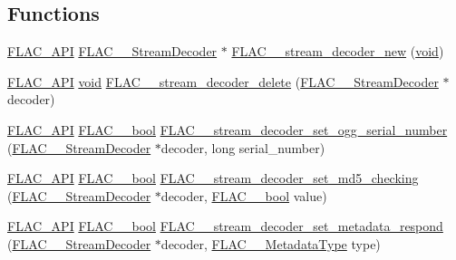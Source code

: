 \subsection*{Functions}
\begin{DoxyCompactItemize}
\item 
\hyperlink{group__flac__export_ga56ca07df8a23310707732b1c0007d6f5}{F\+L\+A\+C\+\_\+\+A\+PI} \hyperlink{struct_f_l_a_c_____stream_decoder}{F\+L\+A\+C\+\_\+\+\_\+\+Stream\+Decoder} $\ast$ \hyperlink{group__flac__stream__decoder_ga7159eefc074dfbab4a37462f69326091}{F\+L\+A\+C\+\_\+\+\_\+stream\+\_\+decoder\+\_\+new} (\hyperlink{png_8h_ac9c84fa68bbad002983e35ce3663c686}{void})
\item 
\hyperlink{group__flac__export_ga56ca07df8a23310707732b1c0007d6f5}{F\+L\+A\+C\+\_\+\+A\+PI} \hyperlink{png_8h_ac9c84fa68bbad002983e35ce3663c686}{void} \hyperlink{group__flac__stream__decoder_gab958ee28b829be37e541946676ad9677}{F\+L\+A\+C\+\_\+\+\_\+stream\+\_\+decoder\+\_\+delete} (\hyperlink{struct_f_l_a_c_____stream_decoder}{F\+L\+A\+C\+\_\+\+\_\+\+Stream\+Decoder} $\ast$decoder)
\item 
\hyperlink{group__flac__export_ga56ca07df8a23310707732b1c0007d6f5}{F\+L\+A\+C\+\_\+\+A\+PI} \hyperlink{ordinals_8h_a95103469f1cbd78b8cf250194985b34e}{F\+L\+A\+C\+\_\+\+\_\+bool} \hyperlink{group__flac__stream__decoder_ga7bb4d567a4a07c911a895b9cef7551d9}{F\+L\+A\+C\+\_\+\+\_\+stream\+\_\+decoder\+\_\+set\+\_\+ogg\+\_\+serial\+\_\+number} (\hyperlink{struct_f_l_a_c_____stream_decoder}{F\+L\+A\+C\+\_\+\+\_\+\+Stream\+Decoder} $\ast$decoder, long serial\+\_\+number)
\item 
\hyperlink{group__flac__export_ga56ca07df8a23310707732b1c0007d6f5}{F\+L\+A\+C\+\_\+\+A\+PI} \hyperlink{ordinals_8h_a95103469f1cbd78b8cf250194985b34e}{F\+L\+A\+C\+\_\+\+\_\+bool} \hyperlink{group__flac__stream__decoder_ga48074d18a17ea88e8272cc8f865ae6e6}{F\+L\+A\+C\+\_\+\+\_\+stream\+\_\+decoder\+\_\+set\+\_\+md5\+\_\+checking} (\hyperlink{struct_f_l_a_c_____stream_decoder}{F\+L\+A\+C\+\_\+\+\_\+\+Stream\+Decoder} $\ast$decoder, \hyperlink{ordinals_8h_a95103469f1cbd78b8cf250194985b34e}{F\+L\+A\+C\+\_\+\+\_\+bool} value)
\item 
\hyperlink{group__flac__export_ga56ca07df8a23310707732b1c0007d6f5}{F\+L\+A\+C\+\_\+\+A\+PI} \hyperlink{ordinals_8h_a95103469f1cbd78b8cf250194985b34e}{F\+L\+A\+C\+\_\+\+\_\+bool} \hyperlink{group__flac__stream__decoder_ga1644555cae7c54215c39bb4971100728}{F\+L\+A\+C\+\_\+\+\_\+stream\+\_\+decoder\+\_\+set\+\_\+metadata\+\_\+respond} (\hyperlink{struct_f_l_a_c_____stream_decoder}{F\+L\+A\+C\+\_\+\+\_\+\+Stream\+Decoder} $\ast$decoder, \hyperlink{group__flac__format_gac71714ba8ddbbd66d26bb78a427fac01}{F\+L\+A\+C\+\_\+\+\_\+\+Metadata\+Type} type)

\end{DoxyCompactItemize}
